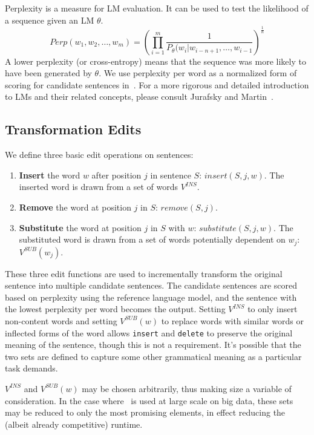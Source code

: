 Perplexity is a measure for LM evaluation. It can be used to test the likelihood
of a sequence given an LM $\theta$.
$$Perp(w_1,w_2,\ldots,w_m) =
    \left(\prod_{i=1}^m
    \frac{1}{P_{\theta}(w_i|w_{i-n+1},\ldots,w_{i-1}}\right)^{\frac{1}{n}}$$
A lower perplexity (or cross-entropy) means that the sequence was more likely to
have been generated by $\theta$. We use perplexity per word as a normalized form
of scoring for candidate sentences in~\sd. For a more rigorous and detailed
introduction to LMs and their related concepts, please consult Jurafsky and
Martin~\cite{j-and-m}.

\subsection{Transformation Edits}

We define three basic edit operations on sentences:
\begin{enumerate}
    \item \textbf{Insert} the word $w$ after position $j$ in sentence $S$:
        $insert(S, j, w)$. The inserted word is drawn from a set of words
        $V^{INS}$.
    \item \textbf{Remove} the word at position $j$ in $S$: $remove(S, j)$.
    \item \textbf{Substitute} the word at position $j$ in $S$ with $w$:
        $substitute(S, j, w)$. The substituted word is drawn from a set of words
        potentially dependent on $w_j$: $V^{SUB}(w_j)$.
\end{enumerate}

These three edit functions are used to incrementally transform the original
sentence into multiple candidate sentences. The candidate sentences are scored
based on perplexity using the reference language model, and the sentence with
the lowest perplexity per word becomes the output. Setting $V^{INS}$ to only
insert non-content words and setting $V^{SUB}(w)$ to replace words with similar
words or inflected forms of the word allows \texttt{insert} and \texttt{delete}
to preserve the original meaning of the sentence, though this is not a
requirement. It's possible that the two sets are defined to capture some other
grammatical meaning as a particular task demands.

$V^{INS}$ and $V^{SUB}(w)$ may be chosen arbitrarily, thus making size a
variable of consideration. In the case where \sd~is used at large scale on big
data, these sets may be reduced to only the most promising elements, in effect
reducing the (albeit already competitive) runtime.

